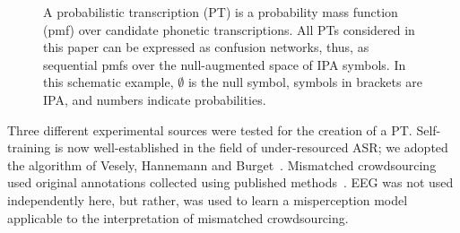 \begin{figure}
\begin{center}
\end{center}
\caption{A probabilistic transcription (PT) is a probability mass
  function (pmf) over candidate phonetic transcriptions.  All PTs
  considered in this paper can be expressed as confusion networks,
  thus, as sequential pmfs over the null-augmented space of IPA
  symbols.  In this schematic example, $\emptyset$ is the null
  symbol, symbols in brackets are IPA, and numbers indicate
  probabilities.}
  \label{fig:pt}
\end{figure}

Three different experimental sources were tested for the creation of a
PT.  Self-training is now well-established in the field of
under-resourced ASR; we adopted the algorithm of Vesely, Hannemann and
Burget~\cite{vesely2013-semi}.  Mismatched crowdsourcing used original
annotations collected using published methods~\cite{JHJ15b}.  EEG was
not used independently here, but rather, was used to learn a
misperception model applicable to the interpretation of mismatched
crowdsourcing.
